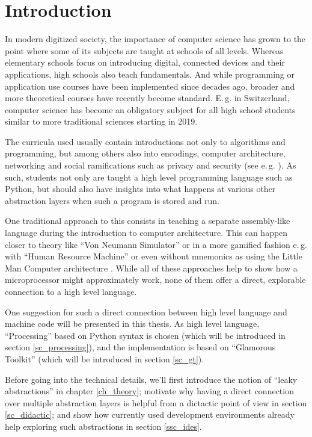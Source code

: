 
\chapter{Introduction}

In modern digitized society, the importance of computer science has grown to the point where some of its subjects are taught at schools of all levels. Whereas elementary schools focus on introducing digital, connected devices and their applications, high schools also teach fundamentals. And while programming or application use courses have been implemented since decades ago, broader and more theoretical courses have recently become standard. E.\,g. in Switzerland, computer science has become an obligatory subject for all high school students similar to more traditional sciences starting in 2019.

The curricula used usually contain introductions not only to algorithms and programming, but among others also into encodings, computer architecture, networking and social ramifications such as privacy and security (see e.\,g. \cite{Erz16}). As such, students not only are taught a high level programming language such as Python, but should also have insights into what happens at various other abstraction layers when such a program is stored and run.

One traditional approach to this consists in teaching a separate assembly-like language during the introduction to computer architecture. This can happen closer to theory like ``Von Neumann Simulator'' \cite{Gan23} or in a more gamified fashion e.\,g. with ``Human Resource Machine'' \cite{Tom15} or even without mnemonics as using the Little Man Computer architecture \cite{Oin25}. While all of these approaches help to show how a microprocessor might approximately work, none of them offer a direct, explorable connection to a high level language.

One suggestion for such a direct connection between high level language and machine code will be presented in this thesis. As high level language, ``Processing'' based on Python syntax is chosen (which will be introduced in section \ref{sc_processing}), and the implementation is based on ``Glamorous Toolkit'' (which will be introduced in section \ref{sc_gt}).

Before going into the technical details, we'll first introduce the notion of ``leaky abstractions'' in chapter \ref{ch_theory}; motivate why having a direct connection over multiple abstraction layers is helpful from a dictactic point of view in section \ref{sc_didactic}; and show how currently used development environments already help exploring such abstractions in section \ref{ssc_ides}.

